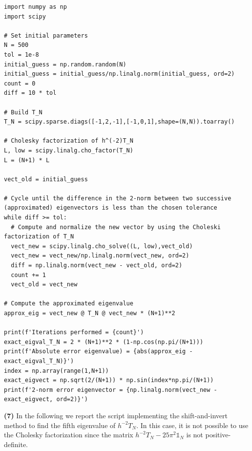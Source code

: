 \documentclass[a4paper,11pt]{article}
\begin{document}
\begin{verbatim}
import numpy as np
import scipy

# Set initial parameters
N = 500
tol = 1e-8
initial_guess = np.random.random(N)
initial_guess = initial_guess/np.linalg.norm(initial_guess, ord=2)
count = 0
diff = 10 * tol

# Build T_N
T_N = scipy.sparse.diags([-1,2,-1],[-1,0,1],shape=(N,N)).toarray()

# Cholesky factorization of h^(-2)T_N
L, low = scipy.linalg.cho_factor(T_N)
L = (N+1) * L

vect_old = initial_guess

# Cycle until the difference in the 2-norm between two successive (approximated) eigenvectors is less than the chosen tolerance
while diff >= tol:
  # Compute and normalize the new vector by using the Choleski factorization of T_N
  vect_new = scipy.linalg.cho_solve((L, low),vect_old)
  vect_new = vect_new/np.linalg.norm(vect_new, ord=2)
  diff = np.linalg.norm(vect_new - vect_old, ord=2)
  count += 1
  vect_old = vect_new

# Compute the approximated eigenvalue
approx_eig = vect_new @ T_N @ vect_new * (N+1)**2

print(f'Iterations performed = {count}')
exact_eigval_T_N = 2 * (N+1)**2 * (1-np.cos(np.pi/(N+1)))
print(f'Absolute error eigenvalue) = {abs(approx_eig - exact_eigval_T_N)}')
index = np.array(range(1,N+1))
exact_eigvect = np.sqrt(2/(N+1)) * np.sin(index*np.pi/(N+1))
print(f'2-norm error eigenvector = {np.linalg.norm(vect_new - exact_eigvect, ord=2)}')
\end{verbatim}


\noindent \textbf{(7)} In the following we report the script implementing the shift-and-invert method to find the fifth eigenvalue of $h^{-2}T_{N}$. In this case, it is not possible to use the Cholesky factorization since the matrix $h^{-2}T_{N} - 25\pi^2\mathbb{1}_{N}$ is not positive-definite.
\end{document}
